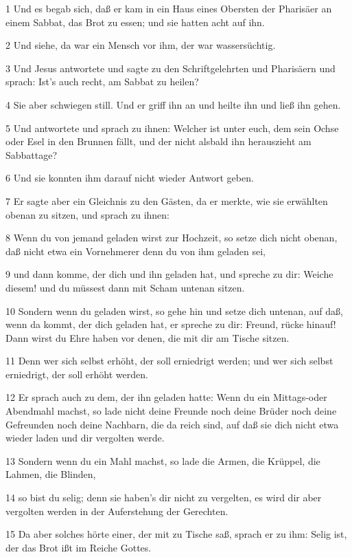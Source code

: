 \par 1 Und es begab sich, daß er kam in ein Haus eines Obersten der Pharisäer an einem Sabbat, das Brot zu essen; und sie hatten acht auf ihn.
\par 2 Und siehe, da war ein Mensch vor ihm, der war wassersüchtig.
\par 3 Und Jesus antwortete und sagte zu den Schriftgelehrten und Pharisäern und sprach: Ist's auch recht, am Sabbat zu heilen?
\par 4 Sie aber schwiegen still. Und er griff ihn an und heilte ihn und ließ ihn gehen.
\par 5 Und antwortete und sprach zu ihnen: Welcher ist unter euch, dem sein Ochse oder Esel in den Brunnen fällt, und der nicht alsbald ihn herauszieht am Sabbattage?
\par 6 Und sie konnten ihm darauf nicht wieder Antwort geben.
\par 7 Er sagte aber ein Gleichnis zu den Gästen, da er merkte, wie sie erwählten obenan zu sitzen, und sprach zu ihnen:
\par 8 Wenn du von jemand geladen wirst zur Hochzeit, so setze dich nicht obenan, daß nicht etwa ein Vornehmerer denn du von ihm geladen sei,
\par 9 und dann komme, der dich und ihn geladen hat, und spreche zu dir: Weiche diesem! und du müssest dann mit Scham untenan sitzen.
\par 10 Sondern wenn du geladen wirst, so gehe hin und setze dich untenan, auf daß, wenn da kommt, der dich geladen hat, er spreche zu dir: Freund, rücke hinauf! Dann wirst du Ehre haben vor denen, die mit dir am Tische sitzen.
\par 11 Denn wer sich selbst erhöht, der soll erniedrigt werden; und wer sich selbst erniedrigt, der soll erhöht werden.
\par 12 Er sprach auch zu dem, der ihn geladen hatte: Wenn du ein Mittags-oder Abendmahl machst, so lade nicht deine Freunde noch deine Brüder noch deine Gefreunden noch deine Nachbarn, die da reich sind, auf daß sie dich nicht etwa wieder laden und dir vergolten werde.
\par 13 Sondern wenn du ein Mahl machst, so lade die Armen, die Krüppel, die Lahmen, die Blinden,
\par 14 so bist du selig; denn sie haben's dir nicht zu vergelten, es wird dir aber vergolten werden in der Auferstehung der Gerechten.
\par 15 Da aber solches hörte einer, der mit zu Tische saß, sprach er zu ihm: Selig ist, der das Brot ißt im Reiche Gottes.
